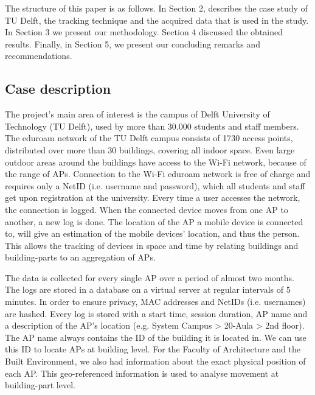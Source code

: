 The structure of this paper is as follows. In Section 2, describes the case study of TU Delft, the tracking technique and the acquired data that is used in the study. In Section 3 we present our methodology. Section 4 discussed the obtained results. Finally, in Section 5, we present our concluding remarks and recommendations. 

\subsection{Case description}\label{ES-caseDescription}
The project’s main area of interest is the campus of Delft University of Technology (TU Delft), used by more than 30.000 students and staff members. The eduroam network of the TU Delft campus consists of 1730 access points, distributed over more than 30 buildings, covering all indoor space. Even large outdoor areas around the buildings have access to the Wi-Fi network, because of the range of APs. Connection to the Wi-Fi eduroam network is free of charge and requires only a NetID (i.e. username and password), which all students and staff get upon registration at the university. Every time a user accesses the network, the connection is logged. When the connected device moves from one AP to another, a new log is done. The location of the AP a mobile device is connected to, will give an estimation of the mobile devices’ location, and thus the person. This allows the tracking of devices in space and time by relating buildings and building-parts to an aggregation of APs.

The data is collected for every single AP over a period of almost two months. The logs are stored in a database on a virtual server at regular intervals of 5 minutes. In order to ensure privacy, MAC addresses and NetIDs (i.e. usernames) are hashed. Every log is stored with a start time, session duration, AP name and a description of the AP’s location (e.g. System Campus > 20-Aula > 2nd floor). The AP name always contains the ID of the building it is located in. We can use this ID to locate APs at building level. For the Faculty of Architecture and the Built Environment, we also had information about the exact physical position of each AP. This geo-referenced information is used to analyse movement at building-part level.